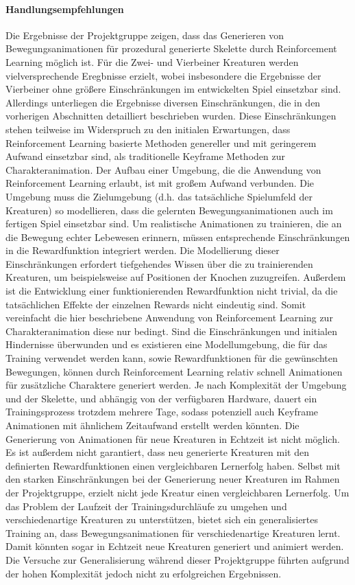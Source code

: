 \paragraph{Handlungsempfehlungen}
Die Ergebnisse der Projektgruppe zeigen, dass das Generieren von Bewegungsanimationen für prozedural generierte Skelette durch Reinforcement Learning möglich ist. Für die Zwei- und Vierbeiner Kreaturen werden vielversprechende Eregbnisse erzielt, wobei insbesondere die Ergebnisse der Vierbeiner ohne größere Einschränkungen im entwickelten Spiel einsetzbar sind.
Allerdings unterliegen die Ergebnisse diversen Einschränkungen, die in den vorherigen Abschnitten detailliert beschrieben wurden. Diese Einschränkungen stehen teilweise im Widerspruch zu den initialen Erwartungen, dass Reinforcement Learning basierte Methoden genereller und mit geringerem Aufwand einsetzbar sind, als traditionelle Keyframe Methoden zur Charakteranimation. Der Aufbau einer Umgebung, die die Anwendung von Reinforcement Learning erlaubt, ist mit großem Aufwand verbunden. Die Umgebung muss die Zielumgebung (d.h. das tatsächliche Spielumfeld der Kreaturen) so modellieren, dass die gelernten Bewegungsanimationen auch im fertigen Spiel einsetzbar sind. Um realistische Animationen zu trainieren, die an die Bewegung echter Lebewesen erinnern, müssen entsprechende Einschränkungen in die Rewardfunktion integriert werden. Die Modellierung dieser Einschränkungen erfordert tiefgehendes Wissen über die zu trainierenden Kreaturen, um beispielsweise auf Positionen der Knochen zuzugreifen. Außerdem ist die Entwicklung einer funktionierenden Rewardfunktion nicht trivial, da die tatsächlichen Effekte der einzelnen Rewards nicht eindeutig sind. Somit vereinfacht die hier beschriebene Anwendung von Reinforcement Learning zur Charakteranimation diese nur bedingt.
Sind die Einschränkungen und initialen Hindernisse überwunden und es existieren eine Modellumgebung, die für das Training verwendet werden kann, sowie Rewardfunktionen für die gewünschten Bewegungen, können durch Reinforcement Learning relativ schnell Animationen für zusätzliche Charaktere generiert werden. Je nach Komplexität der Umgebung und der Skelette, und abhängig von der verfügbaren Hardware, dauert ein Trainingsprozess trotzdem mehrere Tage, sodass potenziell auch Keyframe Animationen mit ähnlichem Zeitaufwand erstellt werden könnten. Die Generierung von Animationen für neue Kreaturen in Echtzeit ist nicht möglich. Es ist außerdem nicht garantiert, dass neu generierte Kreaturen mit den definierten Rewardfunktionen einen vergleichbaren Lernerfolg haben. Selbst mit den starken Einschränkungen bei der Generierung neuer Kreaturen im Rahmen der Projektgruppe, erzielt nicht jede Kreatur einen vergleichbaren Lernerfolg. Um das Problem der Laufzeit der Trainingsdurchläufe zu umgehen und verschiedenartige Kreaturen zu unterstützen, bietet sich ein generalisiertes Training an, dass Bewegungsanimationen für verschiedenartige Kreaturen lernt. Damit könnten sogar in Echtzeit neue Kreaturen generiert und animiert werden. Die Versuche zur Generalisierung während dieser Projektgruppe führten aufgrund der hohen Komplexität jedoch nicht zu erfolgreichen Ergebnissen.


